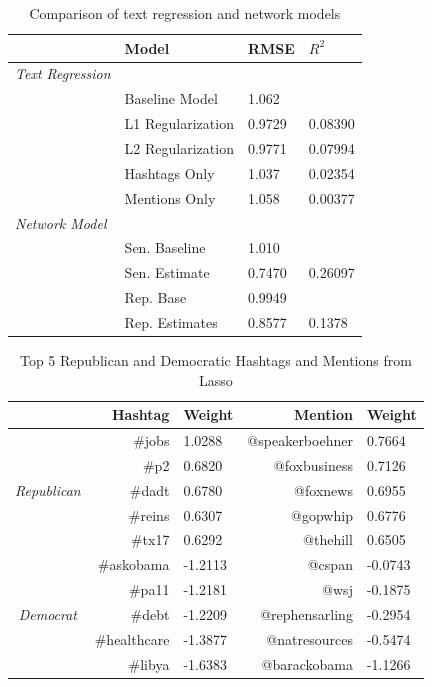 \documentclass[10pt]{article}
\begin{document}
\begin{table}
    \centering
    \caption{Comparison of text regression and network models}
    \begin{tabular}{llll}
        \hline
        & Model & RMSE & $R^{2}$ \\ \hline
        \emph{Text Regression} & & & \\
        & Baseline Model & 1.062 & \\
        & L1 Regularization & 0.9729 & 0.08390 \\
        & L2 Regularization & 0.9771 & 0.07994 \\
        & Hashtags Only & 1.037 & 0.02354 \\
        & Mentions Only & 1.058 & 0.00377 \\ \hline
        \emph{Network Model} & & & \\
        & Sen. Baseline & 1.010 & \\
        & Sen. Estimate & 0.7470 & 0.26097 \\
        & Rep. Base & 0.9949 & \\
        & Rep. Estimates & 0.8577 & 0.1378 \\ \hline
    \end{tabular}
\end{table}

\begin{table}[!ht]
    \caption{Top 5 Republican and Democratic Hashtags and Mentions from Lasso}
    \centering
    \begin{tabular}{cr|l||r|l}
        & Hashtag & Weight & Mention & Weight \\
        \hline
        \multirow{5}{*}{\emph{Republican}}
        & \#jobs & 1.0288 & @speakerboehner & 0.7664 \\
        & \#p2 & 0.6820 & @foxbusiness & 0.7126 \\
        & \#dadt & 0.6780 & @foxnews & 0.6955 \\
        & \#reins & 0.6307 & @gopwhip & 0.6776 \\
        & \#tx17 & 0.6292 & @thehill & 0.6505 \\
        \hline
        \multirow{5}{*}{\emph{Democrat}}
        & \#askobama & -1.2113 & @cspan & -0.0743 \\
        & \#pa11 & -1.2181 & @wsj & -0.1875 \\
        & \#debt & -1.2209 & @rephensarling & -0.2954 \\
        & \#healthcare & -1.3877 & @natresources & -0.5474 \\
        & \#libya & -1.6383 & @barackobama & -1.1266 \\
        \hline
        \end{tabular}
\end{table}
\end{document}
